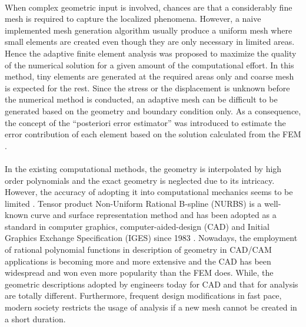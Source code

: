 \paragraph{}
When complex geometric input is involved, chances are that a considerably fine mesh is required to capture the localized phenomena.
However, a naive implemented mesh generation algorithm usually produce a uniform mesh where small elements are created even though they are only necessary in limited areas.
Hence the adaptive finite element analysis was proposed to maximize the quality of the numerical solution for a given amount of the computational effort.
In this method, tiny elements are generated at the required areas only and coarse mesh is expected for the rest.
Since the stress or the displacement is unknown before the numerical method is conducted, an adaptive mesh can be difficult to be generated based on the geometry and boundary condition only.
As a consequence, the concept of the ``posteriori error estimator'' was introduced to estimate the error contribution of each element based on the solution calculated from the FEM \citep{Duval2018, doi:10.1002/gamm.201490020,PRUDHOMME20091887,BAUMAN2009799}.

\paragraph{}
In the existing computational methods, the geometry is interpolated by high order polynomials and the exact geometry is neglected due to its intricacy.
However, the accuracy of adopting it into computational mechanics seems to be limited \citep{Sza2004}.
Tensor product Non-Uniform Rational B-spline (NURBS) is a well-known curve and surface representation method and has been adopted as a standard in computer graphics, computer-aided-design (CAD) \citep{Nas2003} and Initial Graphics Exchange Specification (IGES) since 1983 \citep{IGES1983}.
Nowadays, the employment of rational polynomial functions in description of geometry in CAD/CAM applications is becoming more and more extensive \citep{Pie1987} and the CAD has been widespread and won even more popularity than the FEM does.
While, the geometric descriptions adopted by engineers today for CAD and that for analysis are totally different.
Furthermore, frequent design modifications in fast pace, modern society restricts the usage of analysis if a new mesh cannot be created in a short duration.
